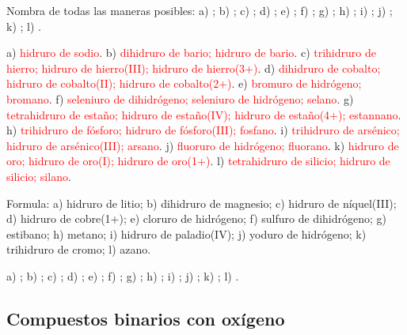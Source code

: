 \begin{exercise}
    Nombra de todas las maneras posibles: a) ; b) ; c) ; d) ; e) ; f) ;
    g) ; h) ; i) ; j) ; k) ; l) .
    \begin{solu}
        a) \textcolor{red}{hidruro de sodio}. b) \textcolor{red}{dihidruro de bario; hidruro de bario}. c)
        \textcolor{red}{trihidruro de hierro; hidruro de hierro(III); hidruro de hierro(3+)}. d) \textcolor{red}{dihidruro de
        cobalto; hidruro de cobalto(II); hidruro de cobalto(2+)}. e) \textcolor{red}{bromuro de hidrógeno; bromano}. f)
        \textcolor{red}{seleniuro de dihidrógeno; seleniuro de hidrógeno; selano}. g) \textcolor{red}{tetrahidruro de estaño;
        hidruro de estaño(IV); hidruro de estaño(4+); estannano}. h) \textcolor{red}{trihidruro de fósforo; hidruro de
        fósforo(III); fosfano}. i) \textcolor{red}{trihidruro de arsénico; hidruro de arsénico(III); arsano}. j)
        \textcolor{red}{fluoruro de hidrógeno; fluorano}. k) \textcolor{red}{hidruro de oro; hidruro de oro(I); hidruro de
        oro(1+)}. l) \textcolor{red}{tetrahidruro de silicio; hidruro de silicio; silano}.
    \end{solu}
\end{exercise}

\begin{exercise}
    Formula: a) hidruro de litio; b) dihidruro de magnesio; c) hidruro de níquel(III); d) hidruro de cobre(1+); e) cloruro de
    hidrógeno; f) sulfuro de dihidrógeno; g) estibano; h) metano; i) hidruro de paladio(IV); j) yoduro de hidrógeno; k)
    trihidruro de cromo; l) azano.
    \begin{solu}
        a) \textcolor{red}{}; b) \textcolor{red}{}; c) \textcolor{red}{}; d) \textcolor{red}{};
        e) \textcolor{red}{}; f) \textcolor{red}{}; g) \textcolor{red}{}; h) \textcolor{red}{};
        i) \textcolor{red}{}; j) \textcolor{red}{}; k) \textcolor{red}{}; l) \textcolor{red}{}.
    \end{solu}
\end{exercise}

\subsection{Compuestos binarios con oxígeno}\label{sec:ud5-oxidos}

